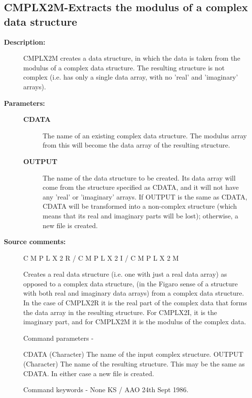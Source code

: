 \subsection{CMPLX2M-\label{CMPLX2M}Extracts the modulus of a complex data structure}
\begin{description}

\item [\textbf{Description:}]
 CMPLX2M creates a data structure, in which the data is taken
 from the modulus of a complex data structure.  The resulting
 structure is not complex (i.e. has only a single data array, with
 no 'real' and 'imaginary' arrays).

\item [\textbf{Parameters:}]
\begin{description}
\item [\textbf{CDATA}]
 The name of an existing complex data structure.
 The modulus array from this will become the data array
 of the resulting structure.
\item [\textbf{OUTPUT}]
 The name of the data structure to be created.
 Its data array will come from the structure specified as
 CDATA, and it will not have any 'real' or 'imaginary'
 arrays.  If OUTPUT is the same as CDATA, CDATA will be
 transformed into a non-complex structure (which means
 that its real and imaginary parts will be lost);
 otherwise, a new file is created.
\end{description}

\item [\textbf{Source comments:}]
\begin{terminalv}
 C M P L X 2 R    /     C M P L X 2 I   /   C M P L X 2 M

 Creates a real data structure (i.e. one with just a real data array)
 as opposed to a complex data structure, (in the Figaro sense of a
 structure with both  real and imaginary data arrays)
 from a complex data structure.
 In the case of CMPLX2R it is the real part of the complex data
 that forms the data array in the resulting structure.
 For CMPLX2I, it is the imaginary part, and for CMPLX2M
 it is the modulus of the complex data.

 Command parameters -

 CDATA    (Character) The name of the input complex structure.
 OUTPUT   (Character) The name of the resulting structure.  This
          may be the same as CDATA. In either case a new file
          is created.

 Command keywords - None
                                     KS / AAO  24th Sept 1986.
\end{terminalv}
\end{description}
